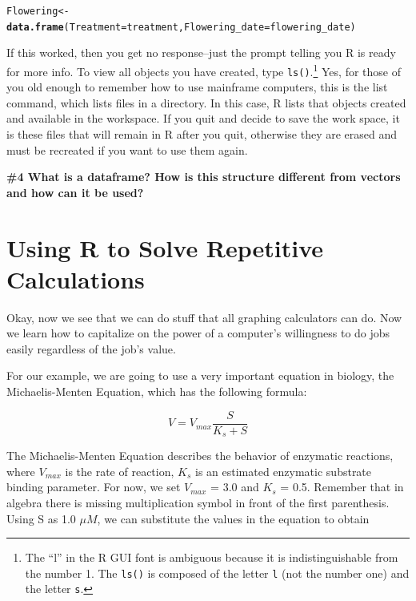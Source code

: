 \documentclass{tufte-handout}\usepackage[]{graphicx}\usepackage[]{xcolor}
\makeatletter
\newcommand{\hlstd}[1]{\textcolor[rgb]{0.345,0.345,0.345}{#1}}%
\newcommand{\hlkwb}[1]{\textcolor[rgb]{0.69,0.353,0.396}{#1}}%
\newcommand{\hlkwc}[1]{\textcolor[rgb]{0.333,0.667,0.333}{#1}}%
\newcommand{\hlkwd}[1]{\textcolor[rgb]{0.737,0.353,0.396}{\textbf{#1}}}%
\newenvironment{kframe}{%
 \def\at@end@of@kframe{}%
 \ifinner\ifhmode%
  \def\at@end@of@kframe{\end{minipage}}%
  \begin{minipage}{\columnwidth}%
 \fi\fi%
 \def\FrameCommand##1{\hskip\@totalleftmargin \hskip-\fboxsep
 \colorbox{shadecolor}{##1}\hskip-\fboxsep
     \hskip-\linewidth \hskip-\@totalleftmargin \hskip\columnwidth}%
 \MakeFramed {\advance\hsize-\width
   \@totalleftmargin\z@ \linewidth\hsize
   \@setminipage}}%
 {\par\unskip\endMakeFramed%
 \at@end@of@kframe}
\newenvironment{knitrout}{}{} %
\makeatother
\begin{document}
\begin{knitrout}
\color{fgcolor}\begin{kframe}
\begin{alltt}
\hlstd{Flowering} \hlkwb{<-} \hlkwd{data.frame}\hlstd{(}\hlkwc{Treatment} \hlstd{= treatment,} \hlkwc{Flowering_date} \hlstd{= flowering_date)}
\end{alltt}
\end{kframe}
\end{knitrout}



If this worked, then you get no response--just the prompt telling you R is ready for more info. To view all objects you have created, type \texttt{ls()}.\footnote{The ``l'' in the R GUI font is ambiguous because it is indistinguishable from the number 1. The \texttt{ls()} is composed of the letter \texttt{l} (not the number one) and the letter \texttt{s}.} Yes, for those of you old enough to remember how to use mainframe computers, this is the list command, which lists files in a directory. In this case, R lists that objects created and available in the workspace. If you quit and decide to save the work space, it is these files that will remain in R after you quit, otherwise they are erased and must be recreated if you want to use them again.  

\bigskip
\noindent \textbf{\#4 What is a dataframe?  How is this structure different from vectors and how can it be used?}

\section{Using R to Solve Repetitive Calculations}

Okay, now we see that we can do stuff that all graphing calculators can do. Now we learn how to capitalize on the power of a computer's willingness to do jobs easily regardless of the job's value. 

For our example, we are going to use a very important equation in biology, the Michaelis-Menten Equation, which has the following formula:

\begin{equation}
V = V_{max}\frac{S}{K_s + S}
\end{equation}

The Michaelis-Menten Equation describes the behavior of enzymatic reactions, where $V_{max}$ is the rate of reaction, $K_s$ is an estimated enzymatic substrate binding parameter. For now, we set $V_{max}$ = 3.0 and $K_s$ = 0.5. Remember that in algebra there is missing multiplication symbol in front of the first parenthesis. Using S as 1.0 $\mu M$, we can substitute the values in the equation to obtain
\end{document}
